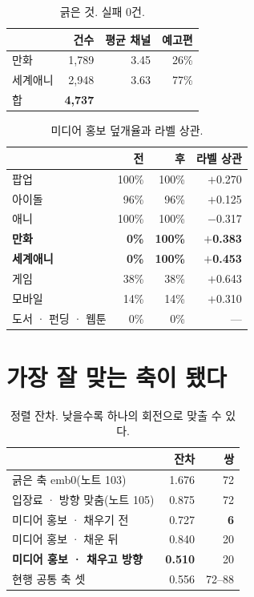 \documentclass[10pt]{article}
\begin{document}
\begin{table}[t]
\centering\tsize
\caption{긁은 것. 실패 0건.}
\begin{tabular}{lrrr}
\toprule
& 건수 & 평균 채널 & 예고편 \\
\midrule
만화 & 1,789 & 3.45 & 26\% \\
세계애니 & 2,948 & 3.63 & 77\% \\
\midrule
합 & \textbf{4,737} & & \\
\bottomrule
\end{tabular}
\end{table}

\begin{table}[t]
\centering\tsize
\caption{미디어 홍보 덮개율과 라벨 상관.}
\begin{tabular}{lrrr}
\toprule
& 전 & 후 & 라벨 상관 \\
\midrule
팝업 & 100\% & 100\% & $+$0.270 \\
아이돌 & 96\% & 96\% & $+$0.125 \\
애니 & 100\% & 100\% & $-$0.317 \\
\textbf{만화} & \textbf{0\%} & \textbf{100\%} & \textbf{$+$0.383} \\
\textbf{세계애니} & \textbf{0\%} & \textbf{100\%} & \textbf{$+$0.453} \\
\midrule
게임 & 38\% & 38\% & $+$0.643 \\
모바일 & 14\% & 14\% & $+$0.310 \\
도서 · 펀딩 · 웹툰 & 0\% & 0\% & --- \\
\bottomrule
\end{tabular}
\end{table}

\section{가장 잘 맞는 축이 됐다}

\begin{table}[t]
\centering\tsize
\caption{정렬 잔차. 낮을수록 하나의 회전으로 맞출 수 있다.}
\begin{tabular}{lrr}
\toprule
& 잔차 & 쌍 \\
\midrule
긁은 축 emb0(노트 103) & 1.676 & 72 \\
입장료 · 방향 맞춤(노트 105) & 0.875 & 72 \\
미디어 홍보 · 채우기 전 & 0.727 & \textbf{6} \\
미디어 홍보 · 채운 뒤 & 0.840 & 20 \\
\textbf{미디어 홍보 · 채우고 방향} & \textbf{0.510} & 20 \\
\midrule
현행 공통 축 셋 & 0.556 & 72--88 \\
\bottomrule
\end{tabular}
\end{table}
\end{document}
